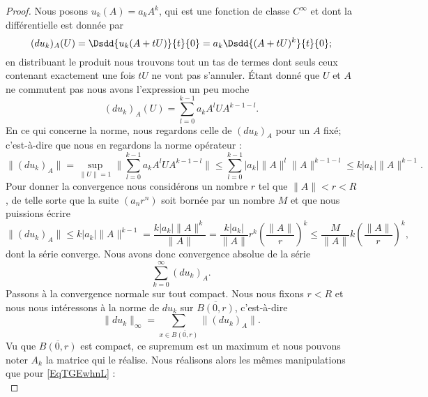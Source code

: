 \begin{proof}
    Nous posons \( u_k(A)=a_kA^k\), qui est une fonction de classe \(  C^{\infty}\) et dont la différentielle est donnée par
    \begin{equation}
        (du_k)_A(U)=\Dsdd{ u_k(A+tU) }{t}{0}=a_k\Dsdd{ (A+tU)^k }{t}{0};
    \end{equation}
    en distribuant le produit nous trouvons tout un tas de termes dont seuls ceux contenant exactement une fois \( tU\) ne vont pas s'annuler. Étant donné que \( U\) et \( A\) ne commutent pas nous avons l'expression un peu moche
    \begin{equation}
        (du_k)_A(U)=\sum_{l=0}^{k-1}a_kA^lUA^{k-1-l}.
    \end{equation}
    En ce qui concerne la norme, nous regardons celle de \( (du_k)_A\) pour un \( A\) fixé; c'est-à-dire que nous en regardons la norme opérateur :
    \begin{equation}
        \| (du_k)_A \|=\sup_{\| U \|=1}\| \sum_{l=0}^{k-1}a_kA^lUA^{k-1-l} \|\leq \sum_{l=0}^{k-1}| a_k |\| A \|^{l}\| A \|^{k-1-l}\leq k| a_k |\| A \|^{k-1}.
    \end{equation}
    Pour donner la convergence nous considérons un nombre \( r\) tel que \( \| A \|<r<R\), de telle sorte que la suite \( (a_nr^n)\) soit bornée par un nombre \( M\) et que nous puissions écrire
    \begin{equation}    \label{EqTGEwhnL}
        \| (du_k)_A \|\leq k| a_k |\| A \|^{k-1}=\frac{ k| a_k |\| A \|^k }{ \| A \| }=\frac{ k| a_k | }{ \| A \| }r^k\left( \frac{ \| A \| }{ r } \right)^k\leq \frac{ M }{ \| A \| }k\left( \frac{ \| A \| }{ r } \right)^k,
    \end{equation}
    dont la série converge. Nous avons donc convergence absolue de la série
    \begin{equation}
        \sum_{k=0}^{\infty}(du_k)_A.
    \end{equation}
    Passons à la convergence normale sur tout compact. Nous nous fixons \( r<R\) et nous nous intéressons à la norme de \( du_k\) sur \( \overline{ B(0,r) }\), c'est-à-dire
    \begin{equation}
        \| du_k \|_{\infty}=\sum_{x\in\overline{ B(0,r) }}\| (du_k)_A \|.
    \end{equation}
    Vu que \( \overline{ B(0,r) }\) est compact, ce supremum est un maximum et nous pouvons noter \( A_k\) la matrice qui le réalise. Nous réalisons alors les mêmes manipulations que pour \eqref{EqTGEwhnL} :
    \begin{equation}

\end{equation}
\end{proof}
